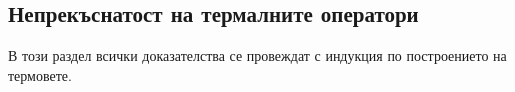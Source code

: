 



\subsection{Непрекъснатост на термалните оператори}


\begin{remark}
  В този раздел всички доказателства се провеждат с индукция по построението на термовете.
\end{remark}

